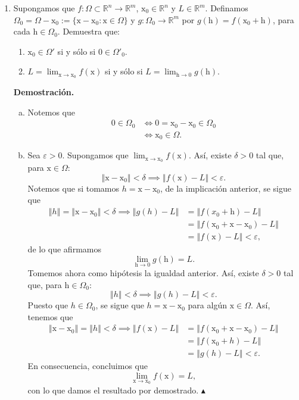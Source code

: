 \documentclass[12pt]{article}
\newcommand{\norm}[1]{\left\Vert#1\right\Vert}
\newcommand{\h}{\mathrm h}
\newcommand{\R}{\mathbb R}
\newcommand{\x}{\mathrm x}
\newcommand{\To}{\longrightarrow}
\begin{document}
\begin{enumerate}
\newpage
\item Supongamos que $f:\Omega\subset \R^n\To \R^m$, $\x_0\in \R^n$ y 
$L\in \R^m$. Definamos $\Omega_0=\Omega-\x_0:=\{ \x-\x_0 : \x\in \Omega \}$ y $g:\Omega_0\To \R^m$ por $g(\h)=f(\x_0+\h)$, para cada $\h\in \Omega_0$. Demuestra que:
\begin{enumerate}[(1)]
\item $\x_0\in \Omega'$ si y s\'olo si $0\in \Omega'_0$.
\item $\displaystyle{L=\lim_{\x\to \x_0} f(\x)}$ si y s\'olo si 
$\displaystyle{L=\lim_{\h\to 0} g(\h)}$.
\end{enumerate}
\textbf{Demostración.}
\begin{enumerate}[(a)]
    \item Notemos que
    \begin{align*}
        0 \in \Omega_0 &\iff 0=\x_0-\x_0 \in \Omega_0 \\
        &\iff \x_0 \in \Omega.
    \end{align*}
    \item Sea $\varepsilon>0$. Supongamos que $\lim_{\x\to\x_0}f(\x)$. Así, existe $\delta >0$ tal que, para $\x\in \Omega$:
    \[
        \norm{\x-\x_0}<\delta \implies \norm{f(\x)-L}<\varepsilon. \tag{1}
    \]
    Notemos que si tomamos $h=\x-\x_0$, de la implicación anterior, se sigue que
    \begin{align*}
        \norm{h}=\norm{\x-\x_0}<\delta \implies \norm{g(h)-L} &=\norm{f(x_0+\h)-L}\\
        &=\norm{f(\x_0+\x-\x_0)-L} \\
        &=\norm{f(\x)-L}<\varepsilon,
    \end{align*}
    de lo que afirmamos
    \[
    \lim_{\h\to 0}g(\h)=L.
    \]
    Tomemos ahora como hipótesis la igualdad anterior. Así, existe $\delta > 0$ tal que, para $\h \in \Omega_0$:
    \[
        \norm{h}<\delta \implies \norm{g(h)-L}<\varepsilon.
    \]
    Puesto que $h \in \Omega_0$, se sigue que $h=\x-\x_0$ para algún $\x \in \Omega$. Así, tenemos que
    \begin{align*}
        \norm{\x-\x_0}=\norm{h}<\delta \implies \norm{f(\x)-L} &= \norm{f(\x_0+\x-\x_0)-L} \\
        &= \norm{f(\x_0+h)-L} \\
        &= \norm{g(h)-L} < \varepsilon.
    \end{align*}
    En consecuencia, concluimos que
    \[
    \lim_{\x\to\x_0}f(\x)=L,
    \]
    con lo que damos el resultado por demostrado. \hfill $\blacktriangle$


\end{enumerate}
\end{enumerate}
\end{document}
